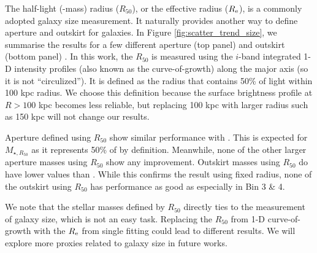 \documentclass[fleqn,usenatbib,useAMS]{mnras}
\begin{document}
\begin{CJK*}{UTF8}{gbsn}
    The half-light (-mass) radius ($R_{50}$), or the effective radius ($R_{\rm e}$), is a commonly 
    adopted galaxy size measurement. 
    It naturally provides another way to define aperture and outskirt for galaxies. 
    In Figure \ref{fig:scatter_trend_size}, we summarise the \topn{} results for a few different 
    aperture (top panel) and outskirt (bottom panel) \mstar{}. 
    In this work, the $R_{50}$ is measured using the $i$-band integrated 1-D intensity profiles 
    (also known as the curve-of-growth) along the major axis (so it is not ``circulized''). 
    It is defined as the radius that contains 50\% of light within 100 kpc radius.
    We choose this definition because the surface brightness profile at $R>100$ kpc becomes 
    less reliable, but replacing 100 kpc with larger radius such as 150 kpc will not change our
    results.
    
    Aperture \mstar{} defined using $R_{50}$ show similar performance with . 
    This is expected for $M_{\star, R_{50}}$ as it represents 50\% of  by definition. 
    Meanwhile, none of the other larger aperture masses using $R_{50}$ show any improvement.
    Outskirt masses using $R_{50}$ do have lower \sigmvir{} values than .
    While this confirms the result using fixed radius, none of the outskirt \mstar{} using $R_{50}$ 
    has performance as good as  especially in Bin 3 \& 4.
    
    We note that the stellar masses defined by $R_{50}$ directly ties to the measurement of galaxy 
    size, which is not an easy task.
    Replacing the $R_{50}$ from 1-D curve-of-growth with the $R_{\rm e}$ from single \ser{} fitting 
    could lead to different results.
    We will explore more \mvir{} proxies related to galaxy size in future works.
    

\end{CJK*}
\end{document}
